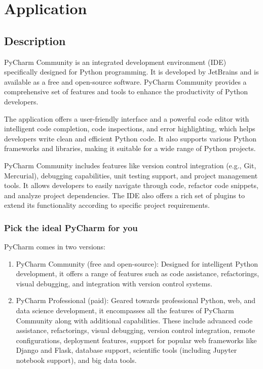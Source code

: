 %
%




\chapter{Application}


\section{Description}
PyCharm Community is an integrated development environment (IDE) specifically designed for Python programming. It is developed by JetBrains and is available as a free and open-source software. PyCharm Community provides a comprehensive set of features and tools to enhance the productivity of Python developers.

The application offers a user-friendly interface and a powerful code editor with intelligent code completion, code inspections, and error highlighting, which helps developers write clean and efficient Python code. It also supports various Python frameworks and libraries, making it suitable for a wide range of Python projects.

PyCharm Community includes features like version control integration (e.g., Git, Mercurial), debugging capabilities, unit testing support, and project management tools. It allows developers to easily navigate through code, refactor code snippets, and analyze project dependencies. The IDE also offers a rich set of plugins to extend its functionality according to specific project requirements.

\subsection{Pick the ideal PyCharm for you}
PyCharm comes in two versions:
\begin{enumerate}
	\item PyCharm Community (free and open-source): Designed for intelligent Python development, it offers a range of features such as code assistance, refactorings, visual debugging, and integration with version control systems.
	\item PyCharm Professional (paid): Geared towards professional Python, web, and data science development, it encompasses all the features of PyCharm Community along with additional capabilities. These include advanced code assistance, refactorings, visual debugging, version control integration, remote configurations, deployment features, support for popular web frameworks like Django and Flask, database support, scientific tools (including Jupyter notebook support), and big data tools.
\end{enumerate}

